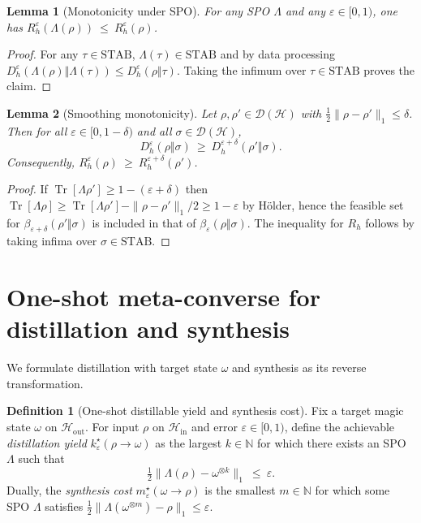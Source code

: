 \documentclass[11pt]{article}
\newtheorem{lemma}{Lemma}
\theoremstyle{definition}
\newtheorem{definition}{Definition}
\DeclareMathOperator{\Tr}{Tr}
\newcommand{\calH}{\mathcal{H}}
\newcommand{\calD}{\mathcal{D}}
\newcommand{\bbN}{\mathbb{N}}
\newcommand{\Dh}[1]{D_h^{#1}}
\begin{document}
\begin{lemma}[Monotonicity under SPO]\label{lem:monotone}
For any SPO $\Lambda$ and any $\varepsilon\in[0,1)$, one has $R_h^{\varepsilon}(\Lambda(\rho))\ \le\ R_h^{\varepsilon}(\rho)$.
\end{lemma}
\begin{proof}
For any $\tau\in\mathrm{STAB}$, $\Lambda(\tau)\in\mathrm{STAB}$ and by data processing
$\Dh{\varepsilon}(\Lambda(\rho)\Vert \Lambda(\tau))\le \Dh{\varepsilon}(\rho\Vert\tau)$.
Taking the infimum over $\tau\in\mathrm{STAB}$ proves the claim.
\end{proof}

\begin{lemma}[Smoothing monotonicity]\label{lem:smooth}
Let $\rho,\rho'\in\calD(\calH)$ with $\tfrac12\|\rho-\rho'\|_1\le\delta$.
Then for all $\varepsilon\in[0,1-\delta)$ and all $\sigma\in\calD(\calH)$,
\begin{equation}\label{eq:smooth}
\Dh{\varepsilon}(\rho\Vert\sigma)\ \ge\ \Dh{\varepsilon+\delta}(\rho'\Vert\sigma).
\end{equation}
Consequently, $R_h^{\varepsilon}(\rho)\ \ge\ R_h^{\varepsilon+\delta}(\rho')$.
\end{lemma}
\begin{proof}
If $\Tr[\Lambda\rho']\ge 1-(\varepsilon+\delta)$ then $\Tr[\Lambda\rho]\ge \Tr[\Lambda\rho']-\|\rho-\rho'\|_1/2 \ge 1-\varepsilon$ by Hölder, hence the feasible set for $\beta_{\varepsilon+\delta}(\rho'\Vert\sigma)$ is included in that of $\beta_\varepsilon(\rho\Vert\sigma)$. The inequality for $R_h$ follows by taking infima over $\sigma\in\mathrm{STAB}$.
\end{proof}

\section{One-shot meta-converse for distillation and synthesis}
We formulate distillation with target state $\omega$ and synthesis as its reverse transformation.

\begin{definition}[One-shot distillable yield and synthesis cost]
Fix a target magic state $\omega$ on $\calH_\mathrm{out}$. For input $\rho$ on $\calH_\mathrm{in}$ and error $\varepsilon\in[0,1)$, define the achievable \emph{distillation yield} $k_\varepsilon^\star(\rho\!\to\!\omega)$ as the largest $k\in\bbN$ for which there exists an SPO $\Lambda$ such that
\begin{equation}
\tfrac12\big\|\Lambda(\rho)-\omega^{\otimes k}\big\|_1\ \le\ \varepsilon.
\end{equation}
Dually, the \emph{synthesis cost} $m_\varepsilon^\star(\omega\!\to\!\rho)$ is the smallest $m\in\bbN$ for which some SPO $\Lambda$ satisfies $\tfrac12\|\Lambda(\omega^{\otimes m})-\rho\|_1\le\varepsilon$.
\end{definition}
\end{document}
